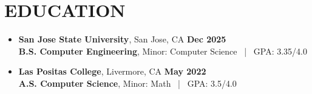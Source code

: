 \documentclass[letterpaper,11pt]{article}
\begin{document}
\section{EDUCATION}
\begin{itemize}
    \item \textbf{San Jose State University}, San Jose, CA \hfill \textbf{Dec 2025} \\ 
    \textbf{B.S. Computer Engineering}, Minor: Computer Science ~|~ GPA: 3.35/4.0 
    \item \textbf{Las Positas College}, Livermore, CA \hfill \textbf{May 2022} \\
    \textbf{A.S. Computer Science}, Minor: Math ~|~ GPA: 3.5/4.0 
\end{itemize}
\end{document}
